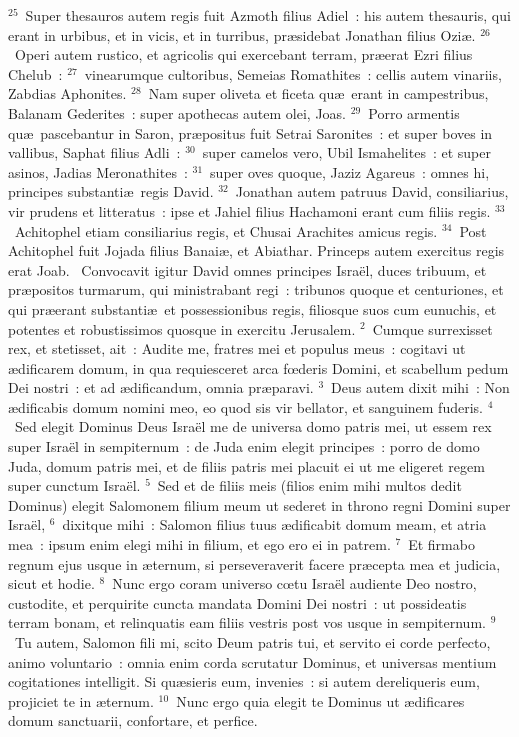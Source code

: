 ${}^{25}$~Super thesauros autem regis fuit Azmoth filius Adiel~: his autem thesauris, qui erant in urbibus, et in vicis, et in turribus, pr\ae sidebat Jonathan filius Ozi\ae .
${}^{26}$~Operi autem rustico, et agricolis qui exercebant terram, pr\ae erat Ezri filius Chelub~:
${}^{27}$~vinearumque cultoribus, Semeias Romathites~: cellis autem vinariis, Zabdias Aphonites.
${}^{28}$~Nam super oliveta et ficeta qu\ae\ erant in campestribus, Balanam Gederites~: super apothecas autem olei, Joas.
${}^{29}$~Porro armentis qu\ae\ pascebantur in Saron, pr\ae positus fuit Setrai Saronites~: et super boves in vallibus, Saphat filius Adli~:
${}^{30}$~super camelos vero, Ubil Ismahelites~: et super asinos, Jadias Meronathites~:
${}^{31}$~super oves quoque, Jaziz Agareus~: omnes hi, principes substanti\ae\ regis David.
${}^{32}$~Jonathan autem patruus David, consiliarius, vir prudens et litteratus~: ipse et Jahiel filius Hachamoni erant cum filiis regis.
${}^{33}$~Achitophel etiam consiliarius regis, et Chusai Arachites amicus regis.
${}^{34}$~Post Achitophel fuit Jojada filius Banai\ae , et Abiathar. Princeps autem exercitus regis erat Joab.
~\lettrine[lines=10,image=true,loversize=0.05,lraise=-0.03]{C}{}onvocavit igitur David omnes principes Isra\"el, duces tribuum, et pr\ae positos turmarum, qui ministrabant regi~: tribunos quoque et centuriones, et qui pr\ae erant substanti\ae\ et possessionibus regis, filiosque suos cum eunuchis, et potentes et robustissimos quosque in exercitu Jerusalem.
${}^{2}$~Cumque surrexisset rex, et stetisset, ait~: Audite me, fratres mei et populus meus~: cogitavi ut \ae dificarem domum, in qua requiesceret arca fœderis Domini, et scabellum pedum Dei nostri~: et ad \ae dificandum, omnia pr\ae paravi.
${}^{3}$~Deus autem dixit mihi~: Non \ae dificabis domum nomini meo, eo quod sis vir bellator, et sanguinem fuderis.
${}^{4}$~Sed elegit Dominus Deus Isra\"el me de universa domo patris mei, ut essem rex super Isra\"el in sempiternum~: de Juda enim elegit principes~: porro de domo Juda, domum patris mei, et de filiis patris mei placuit ei ut me eligeret regem super cunctum Isra\"el.
${}^{5}$~Sed et de filiis meis (filios enim mihi multos dedit Dominus) elegit Salomonem filium meum ut sederet in throno regni Domini super Isra\"el,
${}^{6}$~dixitque mihi~: Salomon filius tuus \ae dificabit domum meam, et atria mea~: ipsum enim elegi mihi in filium, et ego ero ei in patrem.
${}^{7}$~Et firmabo regnum ejus usque in \ae ternum, si perseveraverit facere pr\ae cepta mea et judicia, sicut et hodie.
${}^{8}$~Nunc ergo coram universo cœtu Isra\"el audiente Deo nostro, custodite, et perquirite cuncta mandata Domini Dei nostri~: ut possideatis terram bonam, et relinquatis eam filiis vestris post vos usque in sempiternum.
${}^{9}$~Tu autem, Salomon fili mi, scito Deum patris tui, et servito ei corde perfecto, animo voluntario~: omnia enim corda scrutatur Dominus, et universas mentium cogitationes intelligit. Si qu\ae sieris eum, invenies~: si autem dereliqueris eum, projiciet te in \ae ternum.
${}^{10}$~Nunc ergo quia elegit te Dominus ut \ae dificares domum sanctuarii, confortare, et perfice.


